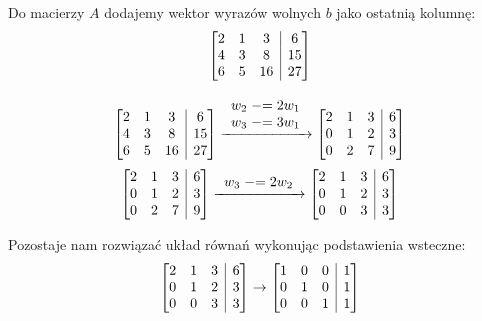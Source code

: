 \documentclass{article}
\begin{document}
Do macierzy $A$ dodajemy wektor wyrazów wolnych $b$ jako ostatnią kolumnę:
\begin{equation}
    \left[\begin{array}{@{}ccc|c@{}}
        2 & 1 & 3 & 6 \\
        4 & 3 & 8 & 15 \\
        6 & 5 & 16 & 27
    \end{array}\right]
\end{equation}


\begin{equation}
    \left[\begin{array}{@{}ccc|c@{}}
        2 & 1 & 3 & 6 \\
        4 & 3 & 8 & 15 \\
        6 & 5 & 16 & 27
    \end{array}\right]
    \xrightarrow{\begin{array}{l} 
        w_2 \mathrel{-}= 2w_1 \\
        w_3 \mathrel{-}= 3w_1
    \end{array}}
    \left[\begin{array}{@{}ccc|c@{}}
        2 & 1 & 3 & 6 \\
        0 & 1 & 2 & 3 \\
        0 & 2 & 7 & 9
    \end{array}\right]
\end{equation}
\begin{equation}
    \left[\begin{array}{@{}ccc|c@{}}
        2 & 1 & 3 & 6 \\
        0 & 1 & 2 & 3 \\
        0 & 2 & 7 & 9
    \end{array}\right]
    \xrightarrow{\begin{array}{l} 
        w_3 \mathrel{-}= 2w_2
    \end{array}}
    \left[\begin{array}{@{}ccc|c@{}}
        2 & 1 & 3 & 6 \\
        0 & 1 & 2 & 3 \\
        0 & 0 & 3 & 3
    \end{array}\right]
\end{equation}

Pozostaje nam rozwiązać układ równań wykonując podstawienia wsteczne:
\begin{equation}
    \left[\begin{array}{@{}ccc|c@{}}
        2 & 1 & 3 & 6 \\
        0 & 1 & 2 & 3 \\
        0 & 0 & 3 & 3
    \end{array}\right]
    \rightarrow
    \left[\begin{array}{@{}ccc|c@{}}
        1 & 0 & 0 & 1 \\
        0 & 1 & 0 & 1 \\
        0 & 0 & 1 & 1
    \end{array}\right]
\end{equation}
\end{document}
